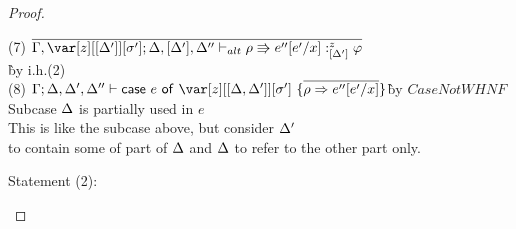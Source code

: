 \begin{proof}
\begin{description}
\begin{tabbing}
    (7) $\ov{\G,\z[\irr{\D'}][\s']; \D,[\D'],\D'' \vdash_{alt} \rho \Rrightarrow e''[e'/x] :^z_{\irr{\D'}} \vp}$\\\` by i.h.(2)\\
    (8) $\G; \D, \D', \D'' \vdash \ccase{e}{\z[\irr{\D,\D'}][\s']~\{\ov{\rho\Rightarrow e''[e'/x]}\}}$\`by $CaseNotWHNF$\\
    Subcase $\Delta$ is partially used in $e$\\
    This is like the subcase above, but consider $\Delta'$\\
    to contain some of part of $\Delta$ and $\Delta$ to refer to the other part only.
\end{tabbing}

\end{description}





Statement (2):
\begin{description}


\end{description}
\end{proof}
